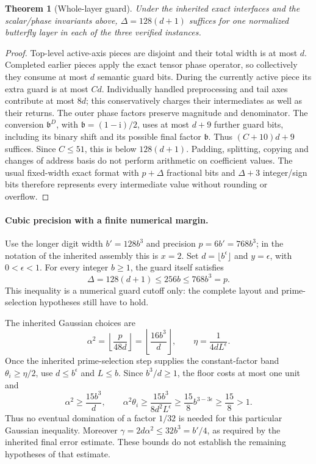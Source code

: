 \documentclass[11pt]{article}
\newtheorem{theorem}{Theorem}
\newcommand{\ii}{\mathrm i}
\begin{document}
\begin{theorem}[Whole-layer guard]
Under the inherited exact interfaces and the scalar/phase invariants above,
$\Delta=128(d+1)$ suffices for one normalized butterfly layer in each
of the three verified instances.
\end{theorem}
\begin{proof}
Top-level active-axis pieces are disjoint and their total width is at most
$d$. Completed earlier pieces apply the exact tensor phase operator, so
collectively they consume at most $d$ semantic guard bits.
During the currently active piece its extra guard is at most $Cd$.
Individually handled preprocessing and tail axes contribute at most $8d$;
this conservatively charges their intermediates as well as their returns.
The outer phase factors preserve magnitude and denominator. The conversion
$\mathfrak b^D$, with $\mathfrak b=(1-\ii)/2$, uses at most $d+9$ further guard bits,
including its binary shift and its possible final factor $\mathfrak b$.
Thus $(C+10)d+9$ suffices. Since $C\le51$, this is below $128(d+1)$.
Padding, splitting, copying and changes of address basis do not perform
arithmetic on coefficient values. The usual fixed-width exact format with
$p+\Delta$ fractional bits and $\Delta+3$ integer/sign bits therefore
represents every intermediate value without rounding or overflow.
\end{proof}

\paragraph{Cubic precision with a finite numerical margin.}
Use the longer digit width $b'=128b^3$ and precision $p=6b'=768b^3$;
in the notation of the inherited assembly this is $x=2$.
Set $d=\lfloor b^\epsilon\rfloor$ and $y=\epsilon$, with $0<\epsilon<1$.
For every integer $b\ge1$, the guard itself satisfies
\[
 \Delta=128(d+1)\le256b\le768b^3=p.
\]
This inequality is a numerical guard cutoff only: the complete layout and
prime-selection hypotheses still have to hold.

The inherited Gaussian choices are
\[
 \alpha^2=\left\lfloor\frac{p}{48d}\right\rfloor
          =\left\lfloor\frac{16b^3}{d}\right\rfloor,
 \qquad \eta=\frac1{4dL^\epsilon}.
\]
Once the inherited prime-selection step supplies the constant-factor band
$\theta_i\ge\eta/2$, use $d\le b^\epsilon$ and $L\le b$.
Since $b^3/d\ge1$, the floor costs at most one unit and
\[
 \alpha^2\ge\frac{15b^3}{d},\qquad
 \alpha^2\theta_i\ge
 \frac{15b^3}{8d^2L^\epsilon}
 \ge\frac{15}{8}b^{3-3\epsilon}\ge\frac{15}{8}>1.
\]
Thus no eventual domination of a factor $1/32$ is needed for this particular
Gaussian inequality. Moreover
$\gamma=2d\alpha^2\le32b^3=b'/4$, as required by the inherited final
error estimate. These bounds do not establish the remaining hypotheses of
that estimate.
\end{document}
